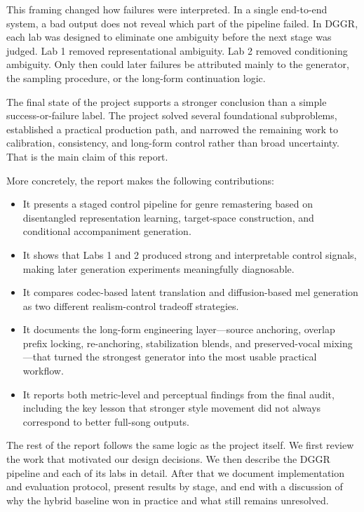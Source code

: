\documentclass[conference]{IEEEtran}
\begin{document}
This framing changed how failures were interpreted. In a single end-to-end system, a bad output does not reveal which part of the pipeline failed. In DGGR, each lab was designed to eliminate one ambiguity before the next stage was judged. Lab 1 removed representational ambiguity. Lab 2 removed conditioning ambiguity. Only then could later failures be attributed mainly to the generator, the sampling procedure, or the long-form continuation logic.

The final state of the project supports a stronger conclusion than a simple success-or-failure label. The project solved several foundational subproblems, established a practical production path, and narrowed the remaining work to calibration, consistency, and long-form control rather than broad uncertainty. That is the main claim of this report.

More concretely, the report makes the following contributions:
\begin{itemize}[leftmargin=1.5em]
    \item It presents a staged control pipeline for genre remastering based on disentangled representation learning, target-space construction, and conditional accompaniment generation.
    \item It shows that Labs 1 and 2 produced strong and interpretable control signals, making later generation experiments meaningfully diagnosable.
    \item It compares codec-based latent translation and diffusion-based mel generation as two different realism-control tradeoff strategies.
    \item It documents the long-form engineering layer---source anchoring, overlap prefix locking, re-anchoring, stabilization blends, and preserved-vocal mixing---that turned the strongest generator into the most usable practical workflow.
    \item It reports both metric-level and perceptual findings from the final audit, including the key lesson that stronger style movement did not always correspond to better full-song outputs.
\end{itemize}

The rest of the report follows the same logic as the project itself. We first review the work that motivated our design decisions. We then describe the DGGR pipeline and each of its labs in detail. After that we document implementation and evaluation protocol, present results by stage, and end with a discussion of why the hybrid baseline won in practice and what still remains unresolved.
\end{document}
